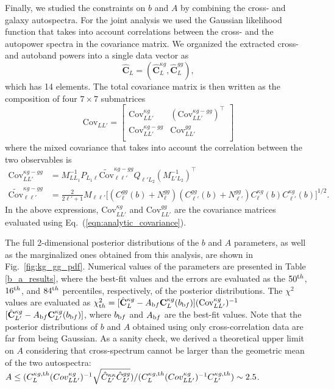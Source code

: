 Finally, we studied the constraints on $b$ and $A$ by combining the cross- and galaxy autospectra. For the joint analysis we used the Gaussian likelihood function that takes into account correlations between the cross- and the autopower spectra in the covariance matrix. We organized the extracted cross- and autoband powers into a single data vector as
\begin{equation}
\mathbf{\hat{C}}_{L} = (\mathbf{\hat{C}}^{\kappa g}_{L}, \mathbf{\hat{C}}^{gg}_{L}),
\end{equation}
which has 14 elements. The total covariance matrix is then written as the composition of four $7\times7$ submatrices
\begin{equation}
\text{Cov}_{LL'} =
\begin{bmatrix}
\text{Cov}^{\kappa g}_{LL'} & (\text{Cov}^{\kappa g-gg}_{LL'})^\intercal \\
 \text{Cov}^{\kappa g-gg}_{LL'} & \text{Cov}^{gg}_{LL'}  \\
\end{bmatrix}
\end{equation}
where the mixed covariance that takes into account the correlation between the two observables is
\begin{align}
 \text{Cov}^{\kappa g-gg}_{LL'} &= M_{LL_1}^{-1}P_{L_1\ell}\widetilde{\text{Cov}}^{\kappa g-gg}_{\ell\ell'}Q_{\ell'L_2}(M_{L'L_2}^{-1})^\intercal \\
{\widetilde{\text{Cov}}^{\kappa g-gg}_{\ell\ell'}} &= \frac{2}{2\ell'+1} 
M_{\ell\ell'}\bigl[(C^{gg}_{\ell}(b)+N^{gg}_{\ell})(C^{gg}_{\ell'}(b)+N^{gg}_{\ell'})C^{\kappa g}_{\ell}(b)C^{\kappa g}_{\ell'}(b) \bigr]^{1/2}.
\end{align}
In the above expressions, $\text{Cov}^{\kappa g}_{LL'}$ and $\text{Cov}^{gg}_{LL'}$ are the covariance matrices evaluated using Eq.~(\eqref{eqn:analytic_covariance}).

The full 2-dimensional posterior distributions of the $b$ and $A$ parameters, as well as the marginalized ones obtained from this analysis, are shown in Fig.~\eqref{fig:kg_gg_pdf}. Numerical values of the parameters are presented in Table \eqref{b_a_results}, where the best-fit values and the errors are evaluated as the $50^{\rm th}$, $16^{\rm th}$, and $84^{\rm th}$ percentiles, respectively, of the posterior distributions. The $\chi^2$ values are evaluated as $\chi^2_{\rm th} = [\hat{\mathbf{C}}^{\kappa g}_L - A_{\rm bf}\mathbf{C}^{\kappa g}_L(b_{\rm bf})] (\text{Cov}^{\kappa g}_{LL'})^{-1}$ $[\hat{\mathbf{C}}^{\kappa g}_{L'} - A_{\rm bf}\mathbf{C}^{\kappa g}_{L'}(b_{\rm bf})] $, where $b_{\rm bf}$ and $A_{\rm bf}$ are the best-fit values. Note that the posterior distributions of $b$ and $A$ obtained using only cross-correlation data are far from being Gaussian. As a sanity check, we derived a theoretical upper limit on $A$ considering that cross-spectrum cannot be larger than the geometric mean of the two autospectra: $A \le (C^{\kappa g, \rm th}_L \rm (Cov^{\kappa g}_{LL'})^{-1} \sqrt{\hat{C}^{\kappa\kappa}_{L'}\hat{C}^{gg}_{L'}})/(C^{\kappa g, \rm th}_L \rm (Cov^{\kappa g}_{LL'})^{-1} C^{\kappa g, \rm th}_{L'}) \sim 2.5$. 

